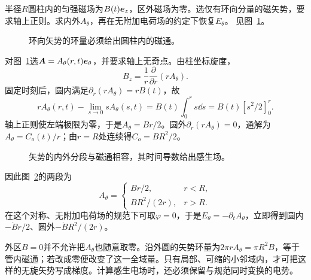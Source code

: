 \begin{exercise}[从圆磁区的矢势恢复感生场]\label{ex:i1-h4}
半径$R$圆柱内的匀强磁场为$B(t)\bm{e}_z$，区外磁场为零。选仅有环向分量的磁矢势，要求轴上正则。求内外$A_\theta$，再在无附加电荷场的约定下恢复$E_\theta$。 见图~\ref{fig:i1-h4-q}。
\end{exercise}

\begin{figure}[H]\centering
{}
\caption{环向矢势的环量必须给出圆柱内的磁通。}\label{fig:i1-h4-q}
\end{figure}
\begin{solution}
对图~\ref{fig:i1-h4-q}选$\bm{A}=A_\theta(r,t)\bm{e}_\theta$，并要求轴上无奇点。由柱坐标旋度，
\[B_z=\frac1r\frac{\partial}{\partial r}(rA_\theta).
\]
固定时刻后，圆内满足$\partial_r(rA_\theta)=rB(t)$，故
\[rA_\theta(r,t)-\lim_{s\to0}sA_\theta(s,t)
=B(t)\int_0^rs\dd s=B(t)[s^2/2]_0^r.\]
轴上正则使左端极限为零，于是$A_\theta=Br/2$。圆外$\partial_r(rA_\theta)=0$，通解为$A_\theta=C_o(t)/r$；由$r=R$处连续得$C_o=BR^2/2$。


\begin{figure}[H]\centering
{}
\caption{矢势的内外分段与磁通相容，其时间导数给出感生场。}\label{fig:i1-h4-s}
\end{figure}

因此图~\ref{fig:i1-h4-s}的两段为
\[\boxed{A_\theta=\begin{cases}Br/2,&r<R,\\BR^2/(2r),&r>R.\end{cases}}
\]
在这个对称、无附加电荷场的规范下可取$\varphi=0$，于是$E_\theta=-\partial_tA_\theta$，立即得到圆内$-\dot Br/2$、圆外$-\dot BR^2/(2r)$。

外区$B=0$并不允许把$A_\theta$也随意取零。沿外圆的矢势环量为$2\pi rA_\theta=\pi R^2B$，等于管内磁通；若改成零便改变了这一全域量。只有局部、可缩的小邻域内，才可把这样的无旋矢势写成梯度。计算感生电场时，还必须保留与规范同时变换的电势。
\end{solution}

